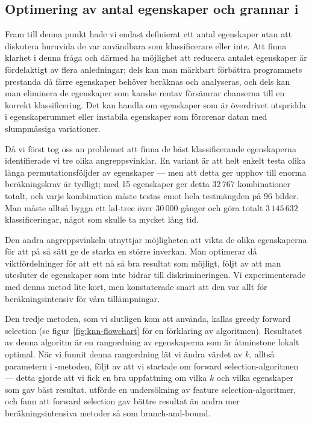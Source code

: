 \documentclass[../rapport_MVEX01-11-05]{subfiles}
\begin{document}
\subsection{Optimering av antal egenskaper och grannar i \knn}
Fram till denna punkt hade vi endast definierat ett antal egenskaper utan att
diskutera huruvida de var användbara som klassificerare eller inte. Att finna
klarhet i denna fråga och därmed ha möjlighet att reducera antalet egenskaper är
fördelaktigt av flera anledningar; dels kan man märkbart förbättra programmets
prestanda då färre egenskaper behöver beräknas och analyseras, och dels kan man
eliminera de egenskaper som kanske rentav försämrar chanserna till en korrekt
klassificering. Det kan handla om egenskaper som är överdrivet utspridda i
egenskapsrummet eller instabila egenskaper som förorenar datan med slumpmässiga
variationer.

Då vi först tog oss an problemet att finna de bäst klassificerande
egenskaperna identifierade vi tre olika angreppsvinklar. En variant är att helt
enkelt testa olika långa permutationsföljder av egenskaper ---
men att detta ger upphov till enorma beräkningskrav är tydligt; med 15
egenskaper ger detta $32\,767$ kombinationer totalt, och varje kombination
måste testas emot hela testmängden på 96 bilder. Man måste alltså bygga ett
kd-tree över $30\,000$ gånger och göra totalt $3\,145\,632$ klassificeringar,
något som skulle ta mycket lång tid.
 
Den andra angreppsvinkeln utnyttjar
möjligheten att vikta de olika egenskaperna för att på så sätt ge de starka en
större inverkan. Man optimerar då
viktfördelninger för att ett nå så bra resultat som möjligt, följt av att man
utesluter de egenskaper som inte bidrar till diskrimineringen. Vi experimenterade
med denna metod lite kort, men konstaterade snart att den var allt för 
beräkningsintensiv för våra tillämpningar.

Den tredje metoden, som vi slutligen kom att
använda, kallas greedy forward selection (se
 figur~\ref{fig:knn-flowchart} för en förklaring av algoritmen).
Resultatet av denna algoritm är en rangordning av egenskaperna som är
åtminstone lokalt optimal. När vi funnit denna rangordning
lät vi ändra värdet av $k$, alltså parametern i \knn-metoden, följt av
att vi startade om forward selection-algoritmen --- detta gjorde att vi
fick en bra uppfattning om vilka $k$ och vilka egenskaper som gav bäst resultat.
 utförde en undersökning av feature selection-algoritmer,
och fann att forward selection gav bättre resultat än andra mer beräkningsintensiva
metoder så som branch-and-bound.
\end{document}
